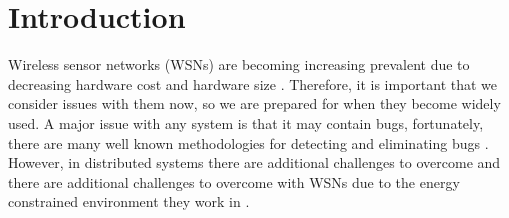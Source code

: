 \section{Introduction}

Wireless sensor networks (WSNs) are becoming increasing prevalent due to decreasing hardware cost and hardware size \cite{TankBible}. Therefore, it is important that we consider issues with them now, so we are prepared for when they become widely used. A major issue with any system is that it may contain bugs, fortunately, there are many well known methodologies for detecting and eliminating bugs \cite{1382572, 749477, ?}. However, in distributed systems there are additional challenges to overcome \cite{5010224} and there are additional challenges to overcome with WSNs due to the energy constrained environment they work in \cite{?}.
